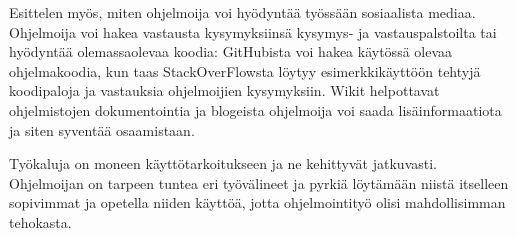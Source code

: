 \documentclass[finnish]{tktltiki2}
\theoremstyle{definition}
\theoremstyle{remark}
\begin{document}
Esittelen myös, miten ohjelmoija voi hyödyntää työssään sosiaalista mediaa. Ohjelmoija voi hakea vastausta kysymyksiinsä kysymys- ja vastauspalstoilta tai hyödyntää olemassaolevaa koodia: GitHubista voi hakea käytössä olevaa ohjelmakoodia, kun taas StackOverFlowsta löytyy esimerkkikäyttöön tehtyjä koodipaloja ja vastauksia ohjelmoijien kysymyksiin.
Wikit helpottavat ohjelmistojen dokumentointia ja blogeista ohjelmoija voi saada lisäinformaatiota ja siten syventää osaamistaan.

Työkaluja on moneen käyttötarkoitukseen ja ne kehittyvät jatkuvasti. Ohjelmoijan on tarpeen tuntea eri työvälineet ja pyrkiä löytämään niistä itselleen sopivimmat ja opetella niiden käyttöä, jotta ohjelmointityö olisi mahdollisimman tehokasta.

\newpage


\end{document}
